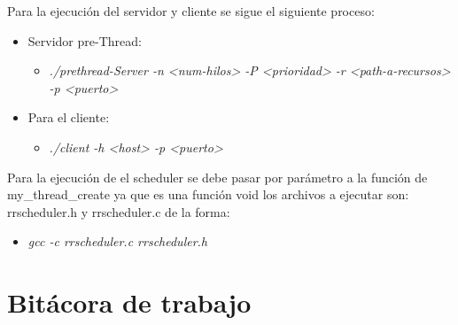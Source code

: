 \documentclass{article}
\let\<\textless
\let\>\textgreater
\begin{document}
Para la ejecuci\'on del servidor y cliente se sigue el siguiente proceso:
\begin{itemize}
  \item Servidor pre-Thread:
  \begin{itemize}
    \item \emph{./prethread-Server -n \<num-hilos\> -P \<prioridad\> -r \<path-a-recursos\> -p \<puerto\>}
  \end{itemize}
  \item Para el cliente:
  \begin{itemize}
    \item \emph{./client -h \<host\> -p \<puerto\>}
  \end{itemize}
\end{itemize}

Para la ejecuci\'on de el scheduler se debe pasar por par\'ametro a la funci\'on de my\_thread\_create ya que es una funci\'on void los archivos a ejecutar son: rrscheduler.h y rrscheduler.c de la forma: 
\begin{itemize}
    \item \emph{gcc -c rrscheduler.c rrscheduler.h}
  \end{itemize}

\section{Bit\'acora de trabajo}
\end{document}
